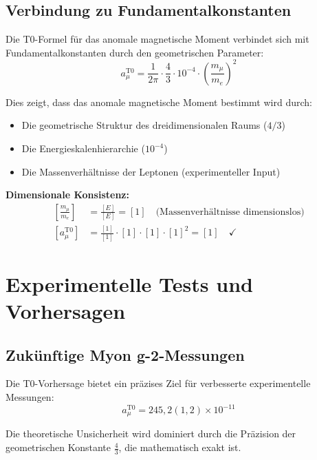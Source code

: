 \documentclass[12pt,a4paper]{report}
\begin{document}
	\subsection{Verbindung zu Fundamentalkonstanten}
	\label{subsec:connection_fundamental_constants}
	
	Die T0-Formel für das anomale magnetische Moment verbindet sich mit Fundamentalkonstanten durch den geometrischen Parameter:
	\begin{equation}
		a_\mu^{\text{T0}} = \frac{1}{2\pi} \cdot \frac{4}{3} \cdot 10^{-4} \cdot \left(\frac{m_\mu}{m_e}\right)^2
	\end{equation}
	
	Dies zeigt, dass das anomale magnetische Moment bestimmt wird durch:
	\begin{itemize}
		\item Die geometrische Struktur des dreidimensionalen Raums ($4/3$)
		\item Die Energieskalenhierarchie ($10^{-4}$)
		\item Die Massenverhältnisse der Leptonen (experimenteller Input)
	\end{itemize}
	
	\textbf{Dimensionale Konsistenz:}
	\begin{align}
		\left[\frac{m_\mu}{m_e}\right] &= \frac{[E]}{[E]} = [1] \quad \text{(Massenverhältnisse dimensionslos)} \\
		[a_\mu^{\text{T0}}] &= \frac{[1]}{[1]} \cdot [1] \cdot [1] \cdot [1]^2 = [1] \quad \checkmark
	\end{align}
	
	\section{Experimentelle Tests und Vorhersagen}
	\label{sec:experimental_tests}
	
	\subsection{Zukünftige Myon g-2-Messungen}
	\label{subsec:future_measurements}
	
	Die T0-Vorhersage bietet ein präzises Ziel für verbesserte experimentelle Messungen:
	\begin{equation}
		a_\mu^{\text{T0}} = 245,2(1,2) \times 10^{-11}
	\end{equation}
	
	Die theoretische Unsicherheit wird dominiert durch die Präzision der geometrischen Konstante $\frac{4}{3}$, die mathematisch exakt ist.
	
\end{document}
